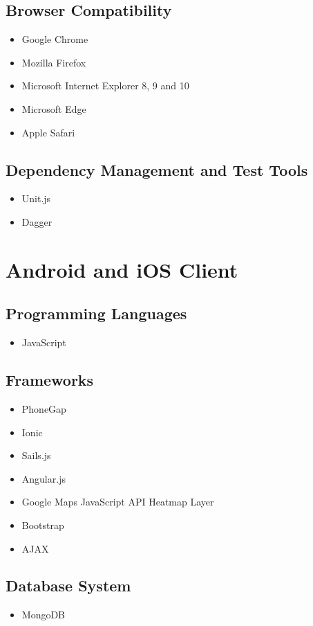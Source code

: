 \documentclass[11pt,fleqn]{book} %
\begin{document}
	\subsection{Browser Compatibility}
	\begin{itemize}
		\item Google Chrome
		\item Mozilla Firefox
		\item Microsoft Internet Explorer 8, 9 and 10
		\item Microsoft Edge
		\item Apple Safari						
	\end{itemize}
	\subsection{Dependency Management and Test Tools}
	\begin{itemize}
		\item Unit.js
		\item Dagger
	\end{itemize}
	\section{Android and iOS Client}
	\subsection{Programming Languages}
	\begin{itemize}
		\item JavaScript
	\end{itemize}
	\subsection{Frameworks}
	\begin{itemize}
		\item PhoneGap
		\item Ionic
		\item Sails.js
		\item Angular.js
		\item Google Maps JavaScript API Heatmap Layer
		\item Bootstrap
		\item AJAX					
	\end{itemize}
	\subsection{Database System}
	\begin{itemize}
		\item MongoDB
	\end{itemize}
\end{document}
